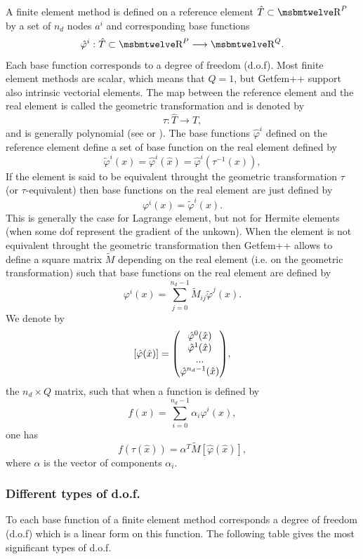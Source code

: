 \documentclass[10pt,a4paper]{article}
\begin{document}
A finite element method is defined on a reference element $\hat{T} \subset \Reel^P$ by a set of $n_d$ nodes $a^i$ and corresponding base functions 
$$ \hat{\varphi}^i : \hat{T} \subset \Reel^P \longrightarrow \Reel^Q. $$
Each base function corresponds to a degree of freedom (d.o.f).
Most finite element methods are scalar, which means that $Q = 1$, but {\sc Getfem++} support also intrinsic vectorial elements. The map between the reference element and the real element is called the geometric transformation and is denoted by 
$$ \tau :  \hat{T} \longrightarrow T, $$
and is generally polynomial (see \cite{dh-to1984} or \cite{BAS_COMP}). The base functions $\hat{\varphi}^i$ defined on the reference element define a set of base function on the real element defined by
$$ \tilde{\varphi}^i(x) = \hat{\varphi}^i(\hat{x}) = \hat{\varphi}^i(\tau^{-1}(x)), $$
If the element is said to be equivalent throught the geometric transformation $\tau$ (or $\tau$-equivalent) then base functions on the real element are just defined by
$$\varphi^i(x) = \tilde{\varphi}^i(x).$$
This is generally the case for Lagrange element, but not for Hermite elements (when some dof represent the gradient of the unkown). When the element is not equivalent throught the geometric transformation then {\sc Getfem++} allows to define a square matrix $\tilde{M}$ depending on the real element (i.e. on the geometric transformation) such that base functions on the real element are defined by
$$ \varphi^i(x) = \sum_{j = 0}^{n_d - 1} \tilde{M}_{ij} \tilde{\varphi}^j(x). $$
We denote by
$$ [\hat{\varphi}(\hat{x})] = {\left(\hspace{-.5em}\begin{array}{c} {\hat{\varphi}^0(\hat{x})} \\ {\hat{\varphi}^1(\hat{x})} \\ {...} \\ {\hat{\varphi}^{n_d-1}(\hat{x})} \end{array}\hspace{-.5em}\right)}, $$
the $n_d \times Q$ matrix, such that when a function is defined by
$$ f(x) = \sum_{i = 0}^{n_d - 1} \alpha_i \varphi^i(x), $$
one has
$$ \hspace{1em} f(\tau(\hat{x})) = \alpha^T \tilde{M} [\hat{\varphi}(\hat{x})],\hspace{1em} $$
where $\alpha$ is the vector of components $\alpha_i$.

\subsubsection{Different types of d.o.f.}

To each base function of a finite element method corresponds a degree of freedom (d.o.f) which is a linear form on this function. The following table gives the most significant types of d.o.f.\\
\end{document}
